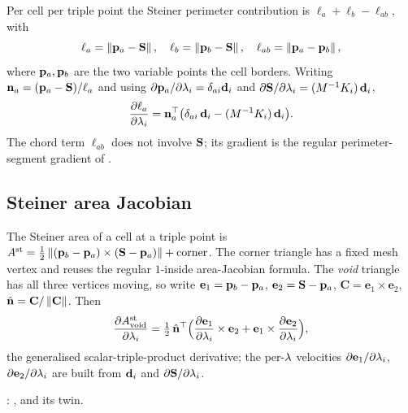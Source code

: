 \documentclass[11pt,a4paper]{article}
\begin{document}
Per cell per triple point the Steiner perimeter contribution is
$\ell_a + \ell_b - \ell_{ab}$, with
\begin{equation}
  \ell_a = \left\|\mathbf{p}_{a}-\mathbf{S}\right\|,\quad
  \ell_b = \left\|\mathbf{p}_{b}-\mathbf{S}\right\|,\quad
  \ell_{ab} = \left\|\mathbf{p}_{a}-\mathbf{p}_{b}\right\|,
\end{equation}
where $\mathbf{p}_{a},\mathbf{p}_{b}$ are the two variable points the cell borders.  Writing
$\mathbf{n}_a = (\mathbf{p}_{a}-\mathbf{S})/\ell_a$ and using
$\partial\mathbf{p}_{a}/\partial\lambda_i = \delta_{ai}\mathbf{d}_{i}$ and
$\partial\mathbf{S}/\partial\lambda_i = (M^{-1}K_i)\,\mathbf{d}_{i}$,
\begin{equation}
  \dfrac{\partial \ell_a}{\partial \lambda_i}
    = \mathbf{n}_a^\top
      \bigl(\delta_{ai}\,\mathbf{d}_{i} - (M^{-1}K_i)\,\mathbf{d}_{i}\bigr).
  \label{eq:dla}
\end{equation}
The chord term $\ell_{ab}$ does not involve $\mathbf{S}$; its gradient is the regular
perimeter-segment gradient of .

\subsection{Steiner area Jacobian}

The Steiner area of a cell at a triple point is
$A^{\mathrm{st}} = \tfrac12\left\|(\mathbf{p}_{b}-\mathbf{p}_{a})\times(\mathbf{S}-\mathbf{p}_{a})\right\| + \text{corner}$.
The corner triangle has a fixed mesh vertex and reuses the regular
$1$-inside area-Jacobian formula.  The \emph{void} triangle has all three
vertices moving, so write $\mathbf{e}_1=\mathbf{p}_{b}-\mathbf{p}_{a}$,
$\mathbf{e}_2=\mathbf{S}-\mathbf{p}_{a}$, $\mathbf{C}=\mathbf{e}_1\times\mathbf{e}_2$,
$\hat{\mathbf{n}}=\mathbf{C}/\left\|\mathbf{C}\right\|$.  Then
\begin{equation}
  \dfrac{\partial A^{\mathrm{st}}_{\text{void}}}{\partial \lambda_i}
    = \tfrac12\,\hat{\mathbf{n}}^\top
      \Bigl(\dfrac{\partial \mathbf{e}_1}{\partial \lambda_i}\times\mathbf{e}_2
            + \mathbf{e}_1\times\dfrac{\partial \mathbf{e}_2}{\partial \lambda_i}\Bigr),
  \label{eq:dA-void}
\end{equation}
the generalised scalar-triple-product derivative; the per-$\lambda$ velocities
$\partial\mathbf{e}_1/\partial\lambda_i$, $\partial\mathbf{e}_2/\partial\lambda_i$
are built from $\mathbf{d}_{i}$ and $\partial\mathbf{S}/\partial\lambda_i$.

\begin{tcolorbox}[colback=blue!4!white, colframe=blue!40!black,
                  title={Code: Steiner first derivatives}, fontupper=\small]
:
,
 and its 
twin.
\end{tcolorbox}
\end{document}
